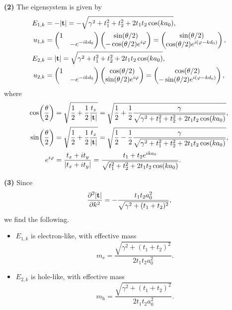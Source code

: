 \documentclass{article}
\makeatletter
\newcommand*{\shifttext}[1]{%
  \settowidth{\@tempdima}{#1}%
  \hspace{-\@tempdima}#1%
}
\newcommand{\plabel}[1]{%
\shifttext{\textbf{#1}\quad}%
}
\makeatother
\begin{document}
\plabel{(2)}%
The eigensystem is given by
\begin{align*}
  E_{1,k} &= -\abs{\vb{t}} = -\sqrt{\gamma^2 + t_1^2 + t_2^2 + 2 t_1 t_2 \cos (k a_0)}, \\
  u_{1,k} &= \begin{pmatrix}
    1 & \\ & -e^{-i k d_0}
  \end{pmatrix} \begin{pmatrix}
    \sin(\theta/2) \\ -\cos(\theta/2) e^{i\varphi}
  \end{pmatrix} = \begin{pmatrix}
    \sin(\theta/2) \\ \cos(\theta/2) e^{i(\varphi - k d_0)}
  \end{pmatrix}, \\
  E_{2,k} &= \abs{\vb{t}} = \sqrt{\gamma^2 + t_1^2 + t_2^2 + 2 t_1 t_2 \cos (k a_0)}, \\
  u_{2,k} &= \begin{pmatrix}
    1 & \\ & -e^{-i k d_0}
  \end{pmatrix} \begin{pmatrix}
    \cos(\theta/2) \\ \sin(\theta/2) e^{i\varphi}
  \end{pmatrix} = \begin{pmatrix}
    \cos(\theta/2) \\ -\sin(\theta/2) e^{i(\varphi - k d_0)}
  \end{pmatrix},
\end{align*}
where
\begin{align*}
  \cos(\frac{\theta}{2}) &= \sqrt{\frac{1}{2} + \frac{1}{2}\frac{t_z}{\abs{\vb{t}}}} = \sqrt{\frac{1}{2} + \frac{1}{2} \frac{\gamma}{\sqrt{\gamma^2 + t_1^2 + t_2^2 + 2 t_1 t_2 \cos (k a_0)}}}, \\
  \sin(\frac{\theta}{2}) &= \sqrt{\frac{1}{2} + \frac{1}{2}\frac{t_z}{\abs{\vb{t}}}} = \sqrt{\frac{1}{2} - \frac{1}{2} \frac{\gamma}{\sqrt{\gamma^2 + t_1^2 + t_2^2 + 2 t_1 t_2 \cos (k a_0)}}}, \\
  e^{i\varphi} &= \frac{t_x + i t_y}{\abs{t_x + i t_y}} = \frac{t_1 + t_2 e^{i k a_0}}{\sqrt{t_1^2 + t_2^2 + 2 t_1 t_2 \cos (k a_0)}}.
\end{align*}

\plabel{(3)}%
Since
\[ \pdv[2]{\abs{\vb{t}}}{k} = - \frac{t_1 t_2 a_0^2}{\sqrt{\gamma^2 + (t_1+t_2)^2}}, \]
we find the following.
\begin{itemize}
  \item $E_{1,k}$ is electron-like, with effective mass
  \[ m_{\mathrm{e}} = \frac{\sqrt{\gamma^2 + (t_1+t_2)^2}}{2 t_1 t_2 a_0^2}. \]
  \item $E_{2,k}$ is hole-like, with effective mass
  \[ m_{\mathrm{h}} = \frac{\sqrt{\gamma^2 + (t_1+t_2)^2}}{2 t_1 t_2 a_0^2}. \]
\end{itemize}
\end{document}
